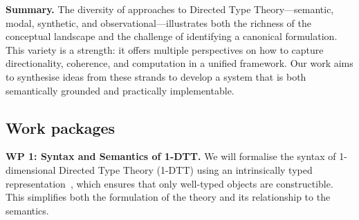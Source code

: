 \documentclass[a4paper,11pt]{article}
\renewcommand{\paragraph}[1]{\textbf{#1.}}
\begin{document}
\paragraph{Summary}
The diversity of approaches to Directed Type Theory—semantic, modal,
synthetic, and observational—illustrates both the richness of the
conceptual landscape and the challenge of identifying a canonical
formulation. This variety is a strength: it offers multiple
perspectives on how to capture directionality, coherence, and
computation in a unified framework. Our work aims to synthesise ideas
from these strands to develop a system that is both semantically
grounded and practically implementable.

\subsection{Work packages}\label{work-packages}%




\paragraph{WP 1: Syntax and Semantics of 1-DTT}
We will formalise the syntax of 1-dimensional Directed Type Theory
(1-DTT) using an intrinsically typed
representation~\cite{altenkirch2016type}, which ensures that only
well-typed objects are constructible. This simplifies both the
formulation of the theory and its relationship to the semantics. 
\end{document}
